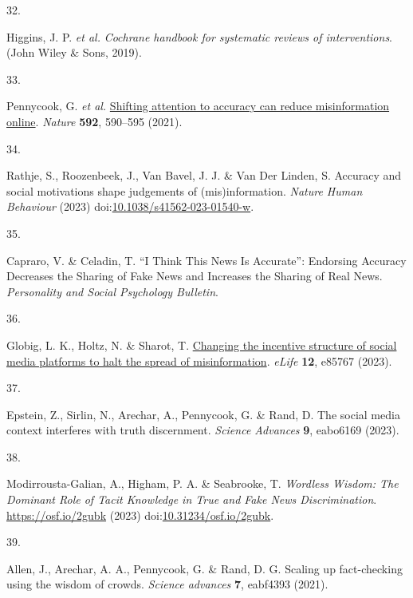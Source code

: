 \documentclass[
  doc,floatsintext]{apa6}
\newlength{\cslhangindent}
\newlength{\csllabelwidth}
\newenvironment{CSLReferences}[2] %
 {\begin{list}{}{%
  \setlength{\itemindent}{0pt}
  \setlength{\leftmargin}{0pt}
  \setlength{\parsep}{0pt}
  \ifodd #1
   \setlength{\leftmargin}{\cslhangindent}
   \setlength{\itemindent}{-1\cslhangindent}
  \fi
  \setlength{\itemsep}{#2\baselineskip}}}
 {\end{list}}
\newcommand{\CSLLeftMargin}[1]{\parbox[t]{\csllabelwidth}{\strut#1\strut}}
\newcommand{\CSLRightInline}[1]{\parbox[t]{\linewidth - \csllabelwidth}{\strut#1\strut}}
\begin{document}
\begin{CSLReferences}{0}{0}
\CSLLeftMargin{32. }%
\CSLRightInline{Higgins, J. P. \emph{et al.} \emph{Cochrane handbook for systematic reviews of interventions}. (John Wiley \& Sons, 2019).}

\CSLLeftMargin{33. }%
\CSLRightInline{Pennycook, G. \emph{et al.} \href{https://doi.org/10.1038/s41586-021-03344-2}{Shifting attention to accuracy can reduce misinformation online}. \emph{Nature} \textbf{592}, 590--595 (2021).}

\CSLLeftMargin{34. }%
\CSLRightInline{Rathje, S., Roozenbeek, J., Van Bavel, J. J. \& Van Der Linden, S. Accuracy and social motivations shape judgements of (mis)information. \emph{Nature Human Behaviour} (2023) doi:\href{https://doi.org/10.1038/s41562-023-01540-w}{10.1038/s41562-023-01540-w}.}

\CSLLeftMargin{35. }%
\CSLRightInline{Capraro, V. \& Celadin, T. {``}I Think This News Is Accurate{''}: Endorsing Accuracy Decreases the Sharing of Fake News and Increases the Sharing of Real News. \emph{Personality and Social Psychology Bulletin}.}

\CSLLeftMargin{36. }%
\CSLRightInline{Globig, L. K., Holtz, N. \& Sharot, T. \href{https://doi.org/10.7554/eLife.85767}{Changing the incentive structure of social media platforms to halt the spread of misinformation}. \emph{eLife} \textbf{12}, e85767 (2023).}

\CSLLeftMargin{37. }%
\CSLRightInline{Epstein, Z., Sirlin, N., Arechar, A., Pennycook, G. \& Rand, D. The social media context interferes with truth discernment. \emph{Science Advances} \textbf{9}, eabo6169 (2023).}

\CSLLeftMargin{38. }%
\CSLRightInline{Modirrousta-Galian, A., Higham, P. A. \& Seabrooke, T. \emph{Wordless Wisdom: The Dominant Role of Tacit Knowledge in True and Fake News Discrimination}. \url{https://osf.io/2gubk} (2023) doi:\href{https://doi.org/10.31234/osf.io/2gubk}{10.31234/osf.io/2gubk}.}

\CSLLeftMargin{39. }%
\CSLRightInline{Allen, J., Arechar, A. A., Pennycook, G. \& Rand, D. G. Scaling up fact-checking using the wisdom of crowds. \emph{Science advances} \textbf{7}, eabf4393 (2021).}


\end{CSLReferences}
\end{document}
